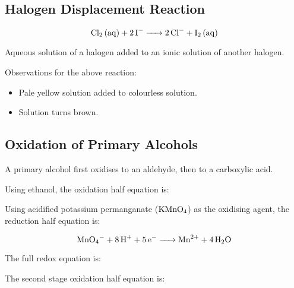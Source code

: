 \documentclass[a4paper,11pt]{article}
\begin{document}
\subsection{Halogen Displacement Reaction}

$$
\ce{Cl2 (aq) + 2I^{-} -> 2Cl^{-} + I2 (aq)}
$$

Aqueous solution of a halogen added to an ionic solution of another halogen.

Observations for the above reaction:

\begin{itemize}
\item Pale yellow solution added to colourless solution.
\item Solution turns brown.
\end{itemize}

\subsection{Oxidation of Primary Alcohols}

A primary alcohol first oxidises to an aldehyde, then to a carboxylic acid.

Using ethanol, the oxidation half equation is:

\begin{center}
\end{center}

Using acidified potassium permanganate ($\ce{KMnO4}$) as the oxidising agent,
the reduction half equation is:

$$
\ce{MnO4- + 8H+ + 5e- -> Mn^{2+} + 4H2O}
$$

The full redox equation is:

\begin{center}
\end{center}

The second stage oxidation half equation is:

\begin{center}
\end{center}
\end{document}
